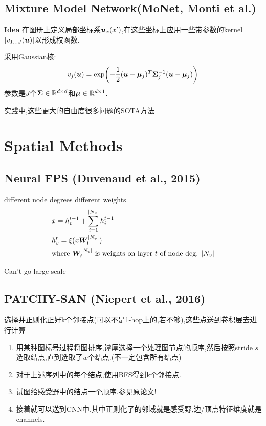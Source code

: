 \documentclass{article}
\begin{document}
\subsection{Mixture Model Network(MoNet, Monti et al.)}

\textbf{Idea} 在图册上定义局部坐标系$\boldsymbol{u}_x(x')$,在这些坐标上应用一些带参数的kernel$[v_{1\dots J}(\boldsymbol{u})]$以形成权函数.

采用Gaussian核:
\begin{align}
    v_j(\boldsymbol{u})=\exp(-\frac{1}{2} (\boldsymbol{u} - \boldsymbol{\mu}_j)^T \boldsymbol{\Sigma}_j^{-1} (\boldsymbol{u} - \boldsymbol{\mu}_j))
\end{align}
参数是$J$个$\boldsymbol{\Sigma} \in \mathbb{R}^{d\times d}$和$\boldsymbol{\mu}\in \mathbb{R}^{d\times 1}$.

实践中,这些更大的自由度\tRarr 很多问题的SOTA方法

\section{Spatial Methods}

\subsection{Neural FPS (Duvenaud et al., 2015)}

 different node degrees \trarr different weights
\begin{align}
    &x=h_v^{t-1}+\sum_{i=1}^{|N_v|}h_i^{t-1}\\
    &h^t_v=\xi(x\boldsymbol{W}_t^{|N_v|})\\
    &\text{where }\boldsymbol{W}_t^{|N_v|} \text{ is weights on layer $t$ of node deg. $|N_v|$}
\end{align}

 Can't go large-scale

\subsection{PATCHY-SAN (Niepert et al., 2016)}

 选择并正则化正好k个邻接点(可以不是1-hop上的,若不够),这些点送到卷积层去进行计算

\begin{enumerate}
    \item {} 用某种图标号过程将图排序,谭厚选择一个处理图节点的顺序,然后按照stride $s$选取结点,直到选取了$w$个结点.(不一定包含所有结点)
    \item {} 对于上述序列中的每个结点,使用BFS得到k个邻接点.
    \item {} 试图给感受野中的结点一个顺序.参见原论文!
    \item {} 接着就可以送到CNN中,其中正则化了的邻域就是感受野,边/顶点特征维度就是channels.
\end{enumerate}
\end{document}
